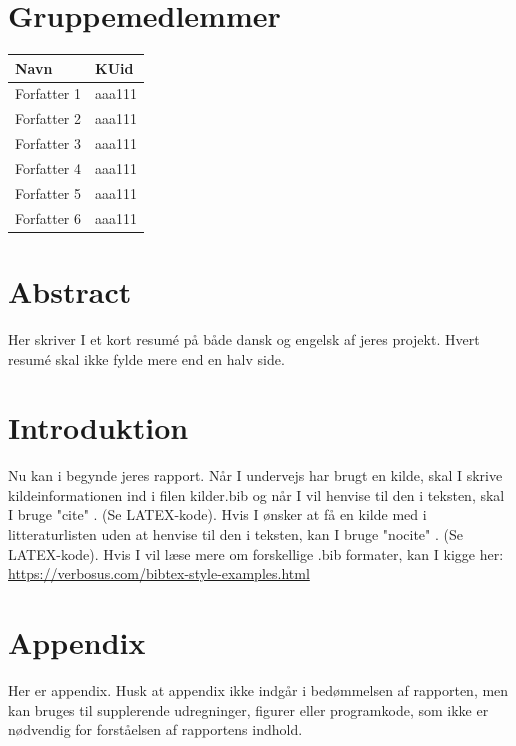 \documentclass[10pt,reqno, usenames]{article}
\begin{document}
\maketitle
\newpage

\section*{Gruppemedlemmer}
\begin{center}
\begin{tabular}{ p{5cm} |p{1.5cm} }
 \centering Navn &   KUid \\ \hline
 Forfatter 1 & aaa111  \\ \hline 
 Forfatter 2 & aaa111  \\ \hline 
 Forfatter 3 & aaa111  \\ \hline 
 Forfatter 4 & aaa111  \\ \hline 
 Forfatter 5 & aaa111  \\ \hline 
 Forfatter 6 & aaa111  \\ \hline 
\end{tabular}
\end{center}

\section*{Abstract}
Her skriver I et kort resumé på både dansk og engelsk af jeres projekt. Hvert resumé skal ikke fylde mere end en halv side. 

\newpage

\tableofcontents

\newpage

\section{Introduktion}

Nu kan i begynde jeres rapport. 
Når I undervejs har brugt en kilde, skal I skrive kildeinformationen ind i filen kilder.bib og når I vil henvise til den i teksten,  skal I bruge "cite" \cite{bog1}. (Se LATEX-kode). Hvis I ønsker at få en kilde med i litteraturlisten uden at henvise til den i teksten, kan I bruge "nocite" \nocite{hjemmseide1}. (Se LATEX-kode).  Hvis I vil læse mere om forskellige .bib formater, kan I kigge her: \href{https://verbosus.com/bibtex-style-examples.html}{https://verbosus.com/bibtex-style-examples.html}



\section{Appendix}
Her er appendix. Husk at appendix ikke indgår i bedømmelsen af rapporten, men kan  bruges  til  
supplerende  udregninger,  figurer  eller  programkode, som  ikke  er nødvendig for forståelsen 
af rapportens indhold.







\end{document}
